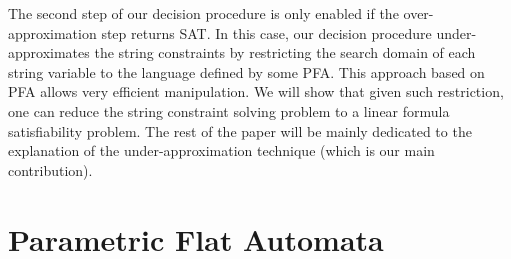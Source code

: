 \documentclass[sigplan,review,anonymous]{acmart}\settopmatter{printfolios=true,printccs=false,printacmref=false}
\begin{document}
The second step of our decision procedure is only enabled if the over-approximation step returns SAT. In this case, our decision procedure  under-approximates the string constraints by restricting the search domain of each string variable to the language defined by some PFA. This approach based on PFA allows very efficient manipulation. We will show that given such restriction, one can reduce the string constraint solving problem to a linear formula satisfiability problem. The rest of the paper will be mainly dedicated to the explanation of the under-approximation technique (which is our main contribution).




%
\section{Parametric Flat Automata} \label{section:sfa}
\end{document}
